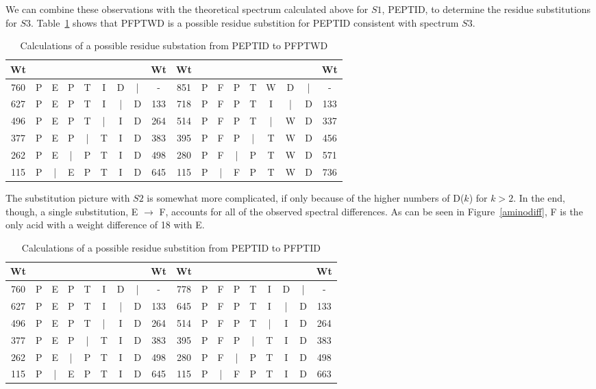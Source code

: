 \documentclass[12pt]{article}
\begin{document}
We can combine these observations with the theoretical spectrum calculated above for $S1$, PEPTID, to determine the residue substitutions for $S3$.  Table~\ref{S3calcs} shows that PFPTWD is a possible residue substition for PEPTID consistent with spectrum $S3$.
\begin{table}[h]
\begin{tabular}{ccccccccc|ccccccccc}
Wt & & & & & & & & Wt&Wt & & & & & & & & Wt\\\hline
760 &P&E&P&T&I&D&|&-&851 &P&F&P&T&W&D&|&-\\
627 &P&E&P&T&I&|&D&133&718 &P&F&P&T&I&|&D&133\\
496 &P&E&P&T&|&I&D&264&514 &P&F&P&T&|&W&D&337\\
377 &P&E&P&|&T&I&D&383&395 &P&F&P&|&T&W&D&456\\
262 &P&E&|&P&T&I&D&498&280 &P&F&|&P&T&W&D&571\\
115 &P&|&E&P&T&I&D&645&115 &P&|&F&P&T&W&D&736\\
\end{tabular}
\caption{Calculations of a possible residue substation from PEPTID to PFPTWD}
\label{S3calcs}
\end{table}

The substitution picture with $S2$ is somewhat more complicated, if only because of the higher numbers of D($k$) for $k > 2$.  In the end, though, a single substitution, E $\rightarrow$ F, accounts for all of the observed spectral differences.  As can be seen in Figure~\ref{aminodiff},  F is the only acid with a weight difference of 18 with E.  
\begin{table}[h]
\begin{tabular}{ccccccccc|ccccccccc}
Wt & & & & & & & & Wt&Wt & & & & & & & & Wt\\\hline
760 &P&E&P&T&I&D&|&-&778 &P&F&P&T&I&D&|&-\\
627 &P&E&P&T&I&|&D&133&645 &P&F&P&T&I&|&D&133\\
496 &P&E&P&T&|&I&D&264&514 &P&F&P&T&|&I&D&264\\
377 &P&E&P&|&T&I&D&383&395 &P&F&P&|&T&I&D&383\\
262 &P&E&|&P&T&I&D&498&280 &P&F&|&P&T&I&D&498\\
115 &P&|&E&P&T&I&D&645&115 &P&|&F&P&T&I&D&663\\
\end{tabular}
\caption{Calculations of a possible residue substition from PEPTID to PFPTID}
\label{S2calcs}
\end{table}

\clearpage
\end{document}
